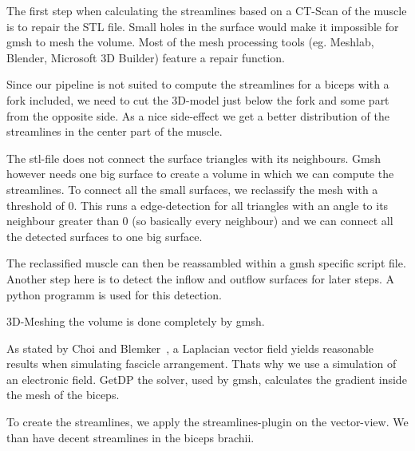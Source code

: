 \documentclass[preprint,journal]{vgtc}       %
\begin{document}
The first step when calculating the streamlines based on a CT-Scan of the muscle is to repair the STL file. 
Small holes in the surface would make it impossible for gmsh to mesh the volume. 
Most of the mesh processing tools (eg. Meshlab, Blender, Microsoft 3D Builder) feature a repair function. %

Since our pipeline is not suited to compute the streamlines for a biceps with a fork included, we need to cut the 3D-model just below the fork and some part from the opposite side.
As a nice side-effect we get a better distribution of the streamlines in the center part of the muscle. %

The stl-file does not connect the surface triangles with its neighbours. 
Gmsh however needs one big surface to create a volume in which we can compute the streamlines. 
To connect all the small surfaces, we reclassify the mesh with a threshold of 0.
This runs a edge-detection for all triangles with an angle to its neighbour greater than 0 (so basically every neighbour) and we can connect all the detected surfaces to one big surface.

The reclassified muscle can then be reassambled within a gmsh specific script file.
Another step here is to detect the inflow and outflow surfaces for later steps. 
A python programm is used for this detection. 

3D-Meshing the volume is done completely by gmsh. %
 
As stated by Choi and Blemker~\cite{Choi2013}, a Laplacian vector field yields reasonable results when simulating fascicle arrangement. 
Thats why we use a simulation of an electronic field. 
GetDP the solver, used by gmsh, calculates the gradient inside the mesh of the biceps.

To create the streamlines, we apply the streamlines-plugin on the vector-view. 
We than have decent streamlines in the biceps brachii.
\end{document}
